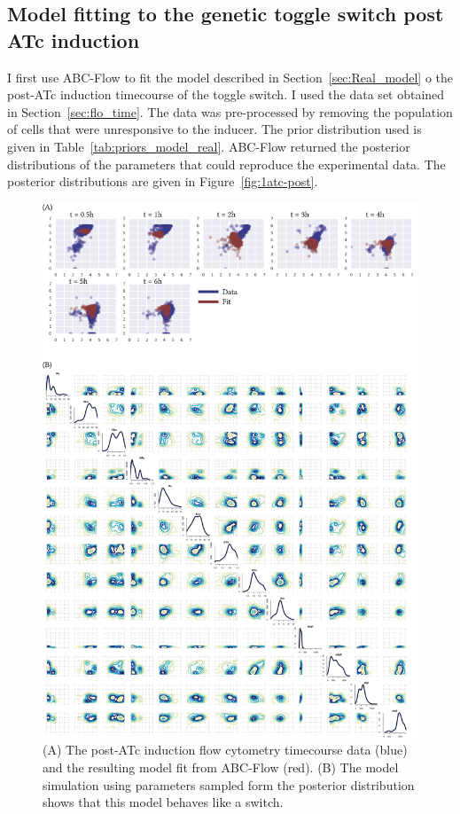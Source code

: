 \subsection{Model fitting to the genetic toggle switch post ATc induction}

I first use ABC-Flow to fit the model described in Section~\ref{sec:Real_model} o the post-ATc induction timecourse of the toggle switch. I used the data set obtained in Section~\ref{sec:flo_time}. The data was pre-processed by removing the population of cells that were unresponsive to the inducer. The prior distribution used is given in Table~\ref{tab:priors_model_real}. ABC-Flow returned the posterior distributions of the parameters that could reproduce the experimental data. The posterior distributions are given in Figure~\ref{fig:1atc-post}. 


\begin{figure}[tb]
\centerfloat
	\includegraphics[width=1.2\textwidth]{../../chapters/chapterABCFlow/images/2D_real_res.png}
	\caption[LoF caption]{\label{fig:1d-real-res} (A) The post-ATc induction flow cytometry timecourse data (blue) and the resulting model fit from ABC-Flow (red). (B) The model simulation using parameters sampled form the posterior distribution shows that this model behaves like a switch. }
\end{figure}

